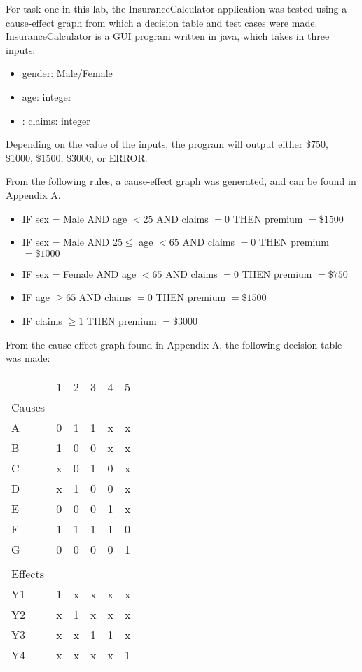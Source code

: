 For task one in this lab, the InsuranceCalculator application was tested using
a cause-effect graph from which a decision table and test cases were made.
InsuranceCalculator is a GUI program
written in java, which takes in three inputs:
\begin{itemize}
	\item gender: Male/Female
	\item age: integer
	\item: claims: integer
\end{itemize}
Depending on the value of the inputs, the program will output either \$750,
\$1000, \$1500, \$3000, or ERROR.

From the following rules, a cause-effect graph was generated, and can be found
in Appendix A.
\begin{itemize}
	\item IF sex = Male AND age $<25$ AND claims $=0$ THEN premium $=\$1500$
	\item IF sex = Male AND $25\leq$ age $<65$ AND claims $=0$ THEN premium
	      $=\$1000$

	\item IF sex = Female AND age $<65$ AND claims $=0$ THEN premium
	      $=\$750$
	\item IF age $\geq 65$ AND claims $=0$ THEN premium $=\$1500$
	\item IF claims $\geq 1$ THEN premium $=\$3000$
\end{itemize}

From the cause-effect graph found in Appendix A, the following decision table
was made:
\vspace{20pt}

\begin{adjustbox}{center}
	\begin{tabular}{llllll}
		        & 1 & 2 & 3 & 4 & 5 \\ %
		Causes  &   &   &   &   &   \\ \cline{1-1}
		A       & 0 & 1 & 1 & x & x \\
		B       & 1 & 0 & 0 & x & x \\
		C       & x & 0 & 1 & 0 & x \\
		D       & x & 1 & 0 & 0 & x \\
		E       & 0 & 0 & 0 & 1 & x \\
		F       & 1 & 1 & 1 & 1 & 0 \\
		G       & 0 & 0 & 0 & 0 & 1 \\
		        &   &   &   &   &   \\
		Effects &   &   &   &   &   \\ \cline{1-1}
		Y1      & 1 & x & x & x & x \\
		Y2      & x & 1 & x & x & x \\
		Y3      & x & x & 1 & 1 & x \\
		Y4      & x & x & x & x & 1
	\end{tabular}%
\end{adjustbox}

